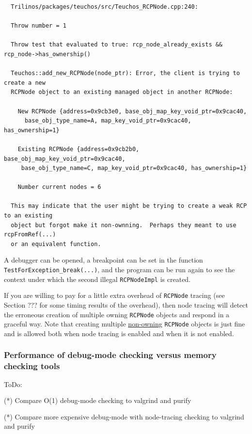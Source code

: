 \documentclass[pdf,ps2pdf,11pt]{SANDreport}
\begin{document}
{\small\begin{verbatim}
  Trilinos/packages/teuchos/src/Teuchos_RCPNode.cpp:240:
  
  Throw number = 1
  
  Throw test that evaluated to true: rcp_node_already_exists && rcp_node->has_ownership()
  
  Teuchos::add_new_RCPNode(node_ptr): Error, the client is trying to create a new
  RCPNode object to an existing managed object in another RCPNode:
  
    New RCPNode {address=0x9cb3e0, base_obj_map_key_void_ptr=0x9cac40,
      base_obj_type_name=A, map_key_void_ptr=0x9cac40, has_ownership=1}
  
    Existing RCPNode {address=0x9cb2b0, base_obj_map_key_void_ptr=0x9cac40,
     base_obj_type_name=C, map_key_void_ptr=0x9cac40, has_ownership=1}
  
    Number current nodes = 6
  
  This may indicate that the user might be trying to create a weak RCP to an existing
  object but forgot make it non-ownning.  Perhaps they meant to use rcpFromRef(...)
  or an equivalent function.
\end{verbatim}}

A debugger can be opened, a breakpoint can be set in the function
{}\texttt{TestForException\_break(...)}, and the program can be run
again to see the context under which the second illegal
{}\texttt{RCPNodeImpl} is created.

If you are willing to pay for a little extra overhead of
{}\texttt{RCPNode} tracing (see Section ??? for some timing results of
the overhead), then node tracing will detect the erroneous creation of
multiple owning {}\texttt{RCPNode} objects and respond in a graceful
way.  Note that creating multiple {}\underline{non-owning}
{}\texttt{RCPNode} objects is just fine and is allowed both when node
tracing is enabled and when it is not enabled.


%
{}\subsubsection{Performance of debug-mode checking versus memory
checking tools}
%

ToDo:

(*) Compare O(1) debug-mode checking to valgrind and purify

(*) Compare more expensive debug-mode with node-tracing checking to
valgrind and purify
\end{document}

